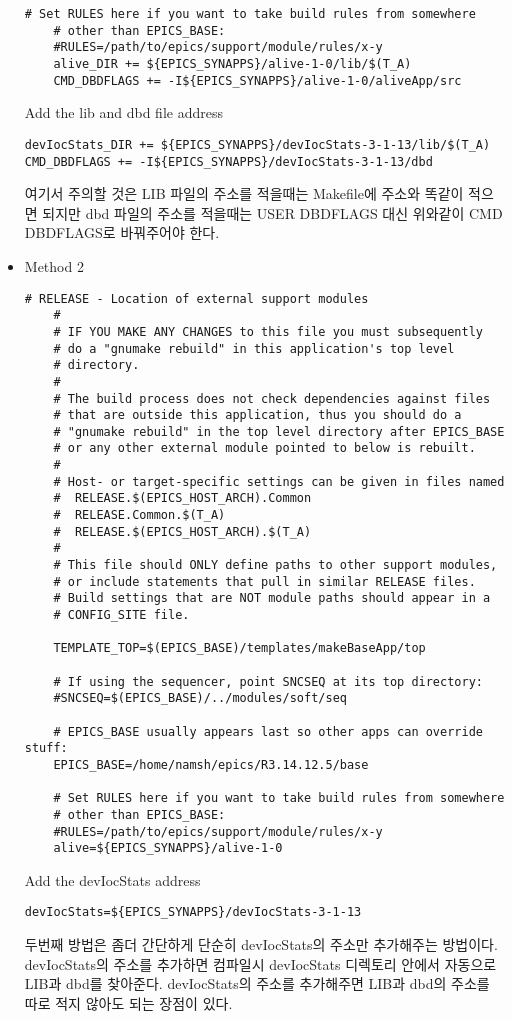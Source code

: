 \documentclass[11pt
  , a4paper
  , article
  , oneside
]{memoir}
\begin{document}
\begin{itemize}
\begin{lstlisting}[style=termstyle]
	# Set RULES here if you want to take build rules from somewhere
	# other than EPICS_BASE:
	#RULES=/path/to/epics/support/module/rules/x-y
	alive_DIR += ${EPICS_SYNAPPS}/alive-1-0/lib/$(T_A)
	CMD_DBDFLAGS += -I${EPICS_SYNAPPS}/alive-1-0/aliveApp/src
	\end{lstlisting}
	Add the lib and dbd file address
	\begin{lstlisting}[style=termstyle]
devIocStats_DIR += ${EPICS_SYNAPPS}/devIocStats-3-1-13/lib/$(T_A)
CMD_DBDFLAGS += -I${EPICS_SYNAPPS}/devIocStats-3-1-13/dbd
\end{lstlisting}
	여기서 주의할 것은 LIB 파일의 주소를 적을때는 Makefile에 주소와 똑같이 적으면 되지만 dbd 파일의 주소를 
	적을때는  USER DBDFLAGS 대신 위와같이 CMD DBDFLAGS로 바꿔주어야 한다.
	\item Method 2
	\begin{lstlisting}[style=termstyle]
	# RELEASE - Location of external support modules
	#
	# IF YOU MAKE ANY CHANGES to this file you must subsequently
	# do a "gnumake rebuild" in this application's top level
	# directory.
	#
	# The build process does not check dependencies against files
	# that are outside this application, thus you should do a
	# "gnumake rebuild" in the top level directory after EPICS_BASE
	# or any other external module pointed to below is rebuilt.
	#
	# Host- or target-specific settings can be given in files named
	#  RELEASE.$(EPICS_HOST_ARCH).Common
	#  RELEASE.Common.$(T_A)
	#  RELEASE.$(EPICS_HOST_ARCH).$(T_A)
	#
	# This file should ONLY define paths to other support modules,
	# or include statements that pull in similar RELEASE files.
	# Build settings that are NOT module paths should appear in a
	# CONFIG_SITE file.
	
	TEMPLATE_TOP=$(EPICS_BASE)/templates/makeBaseApp/top
	
	# If using the sequencer, point SNCSEQ at its top directory:
	#SNCSEQ=$(EPICS_BASE)/../modules/soft/seq
	
	# EPICS_BASE usually appears last so other apps can override stuff:
	EPICS_BASE=/home/namsh/epics/R3.14.12.5/base
	
	# Set RULES here if you want to take build rules from somewhere
	# other than EPICS_BASE:
	#RULES=/path/to/epics/support/module/rules/x-y
	alive=${EPICS_SYNAPPS}/alive-1-0
	\end{lstlisting}
	Add the devIocStats address
	\begin{lstlisting}[style=termstyle]
devIocStats=${EPICS_SYNAPPS}/devIocStats-3-1-13
\end{lstlisting}
	두번째 방법은 좀더 간단하게 단순히 devIocStats의 주소만 추가해주는 방법이다. devIocStats의 주소를 추가하면 컴파일시 devIocStats 디렉토리 안에서 자동으로 LIB과 dbd를 찾아준다. devIocStats의 주소를 추가해주면 LIB과 dbd의 주소를 따로 적지 않아도 되는 장점이 있다. 
\end{itemize}
\end{document}
